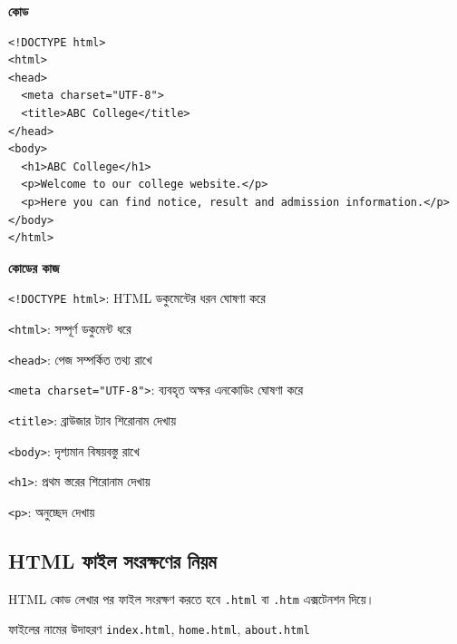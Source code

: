 \par\noindent
\begin{minipage}[t]{.54\linewidth}\vspace{0pt}\small
\textbf{\color{chFourTeal}কোড}\par
\begin{verbatim}
<!DOCTYPE html>
<html>
<head>
  <meta charset="UTF-8">
  <title>ABC College</title>
</head>
<body>
  <h1>ABC College</h1>
  <p>Welcome to our college website.</p>
  <p>Here you can find notice, result and admission information.</p>
</body>
</html>
\end{verbatim}

\par\smallskip
\end{minipage}\hfill
\begin{minipage}[t]{.42\linewidth}\vspace{0pt}\small
\small

\textbf{\color{chFourTeal}কোডের কাজ}\par
\texttt{<!DOCTYPE html>}: HTML ডকুমেন্টের ধরন ঘোষণা করে\par\smallskip
\texttt{<html>}: সম্পূর্ণ ডকুমেন্ট ধরে\par\smallskip
\texttt{<head>}: পেজ সম্পর্কিত তথ্য রাখে\par\smallskip
\texttt{<meta charset="UTF-8">}: ব্যবহৃত অক্ষর এনকোডিং ঘোষণা করে\par\smallskip
\texttt{<title>}: ব্রাউজার ট্যাব শিরোনাম দেখায়\par\smallskip
\texttt{<body>}: দৃশ্যমান বিষয়বস্তু রাখে\par\smallskip
\texttt{<h1>}: প্রথম স্তরের শিরোনাম দেখায়\par\smallskip
\texttt{<p>}: অনুচ্ছেদ দেখায়\par\smallskip
\end{minipage}\par


\subsection{HTML ফাইল সংরক্ষণের নিয়ম}

HTML কোড লেখার পর ফাইল সংরক্ষণ করতে হবে \texttt{.html} বা \texttt{.htm} এক্সটেনশন দিয়ে।

\begin{examplebox}{ফাইলের নামের উদাহরণ}
\texttt{index.html}, \texttt{home.html}, \texttt{about.html}
\end{examplebox}

